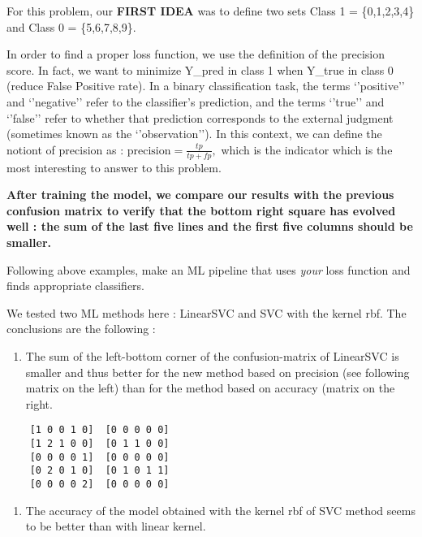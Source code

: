 \documentclass[10pt,a4paper]{article}
\providecommand{\tightlist}{%
  \setlength{\parskip}{0pt}
  }
\theoremstyle{break}
\begin{document}
For this problem, our \textbf{FIRST IDEA} was to define two sets Class 1 = \{0,1,2,3,4\} and Class 0 = \{5,6,7,8,9\}.

In order to find a proper loss function, we use the definition of the precision score.
In fact, we want to minimize Y\_pred in class 1 when Y\_true in class 0 (reduce False Positive rate).
In a binary classification task, the terms `'positive'' and `'negative'' refer to the classifier's prediction, and the terms `'true'' and `'false'' refer to whether that prediction corresponds to the external judgment (sometimes known as the `'observation''). In this context, we can define the notiont of precision as : \(\text{precision} = \frac{tp}{tp + fp},\) which is the indicator which is the most interesting to answer to this problem.

\textbf{\faArrowCircleRight{} After training the model, we compare our results with the previous confusion matrix to verify that the bottom right square has evolved well : the sum of the last five lines and the first five columns should be smaller.}

\begin{tcolorbox}

Following above examples, make an ML pipeline that uses \emph{your} loss function and finds appropriate classifiers.

\end{tcolorbox}

We tested two ML methods here : LinearSVC and SVC with the kernel rbf. The conclusions are the following :

\begin{enumerate}
\def\labelenumi{\arabic{enumi}.}
\tightlist
\item
  The sum of the left-bottom corner of the confusion-matrix of LinearSVC is smaller and thus better for the new method based on precision (see following matrix on the left) than for the method based on accuracy (matrix on the right.
\end{enumerate}

\footnotesize

\begin{verbatim}
    [1 0 0 1 0]  [0 0 0 0 0]
    [1 2 1 0 0]  [0 1 1 0 0]
    [0 0 0 0 1]  [0 0 0 0 0]
    [0 2 0 1 0]  [0 1 0 1 1]
    [0 0 0 0 2]  [0 0 0 0 0]
\end{verbatim}

\normalsize

\begin{enumerate}
\def\labelenumi{\arabic{enumi}.}
\setcounter{enumi}{1}
\tightlist
\item
  The accuracy of the model obtained with the kernel rbf of SVC method seems to be better than with linear kernel.
\end{enumerate}
\end{document}
